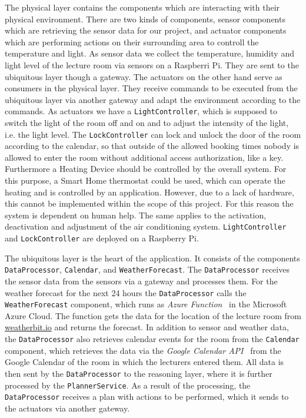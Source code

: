 \documentclass[runningheads]{llncs}
\begin{document}
The physical layer contains the components which are interacting with their physical environment.
There are two kinds of components, sensor components which are retrieving the sensor data for our project, and actuator components which are performing actions on their surrounding area to controll the temperature and light.
As sensor data we collect the temperature, humidity and light level of the lecture room via sensors on a Raspberri Pi.
They are sent to the ubiquitous layer though a gateway.
The actuators on the other hand serve as consumers in the physical layer.
They receive commands to be executed from the ubiquitous layer via another gateway and adapt the environment according to the commands.
As actuators we have a \texttt{LightController}, which is supposed to switch the light of the room off and on and to adjust the intensity of the light, i.e. the light level.
The \texttt{LockController} can lock and unlock the door of the room according to the calendar, so that outside of the allowed booking times nobody is allowed to enter the room without additional access authorization, like a key.
Furthermore a Heating Device should be controlled by the overall system.
For this purpose, a Smart Home thermostat could be used, which can operate the heating and is controlled by an application.
However, due to a lack of hardware, this cannot be implemented within the scope of this project.
For this reason the system is dependent on human help.
The same applies to the activation, deactivation and adjustment of the air conditioning system.
\texttt{LightController} and \texttt{LockController} are deployed on a Raspberry Pi.

The ubiquitous layer is the heart of the application.
It consists of the components \texttt{DataProcessor}, \texttt{Calendar}, and \texttt{WeatherForecast}.
The \texttt{DataProcessor} receives the sensor data from the sensors via a gateway and processes them.
For the weather forecast for the next 24 hours the \texttt{DataProcessor} calls the \texttt{WeatherForecast} component, which runs as \textit{Azure Function}~\cite{AzureFun50:online} in the Microsoft Azure Cloud.
The function gets the data for the location of the lecture room from \url{weatherbit.io} and returns the forecast.
In addition to sensor and weather data, the \texttt{DataProcessor} also retrieves calendar events for the room from the \texttt{Calendar} component, which retrieves the data via the \textit{Google Calendar API}~\cite{APIRefer59:online} from the Google Calendar of the room in which the lecturers entered them.
All data is then sent by the \texttt{DataProcessor} to the reasoning layer, where it is further processed by the \texttt{PlannerService}.
As a result of the processing, the \texttt{DataProcessor} receives a plan with actions to be performed, which it sends to the actuators via another gateway.
\end{document}
